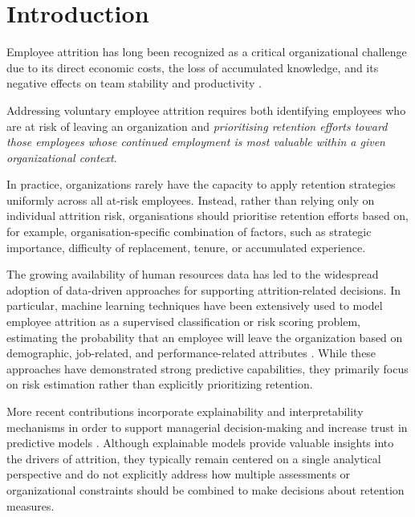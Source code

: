 \documentclass[runningheads]{llncs}
\begin{document}
%
%
%
\newpage
\section{Introduction}

Employee attrition has long been recognized as a critical organizational challenge due to its direct economic costs, the loss of accumulated knowledge, and its negative effects on team stability and productivity \cite{ref_manafi2025,ref_gundlach2025}.

Addressing voluntary employee attrition requires both identifying employees who are at risk of leaving an organization and \textit{prioritising retention efforts toward those employees whose continued employment is most valuable within a given organizational context}.

In practice, organizations rarely have the capacity to apply retention strategies uniformly across all at-risk employees. Instead, rather than relying only on individual attrition risk, organisations should prioritise retention efforts based on, for example, organisation-specific combination of factors, such as strategic importance, difficulty of replacement, tenure, or accumulated experience.

The growing availability of human resources data has led to the widespread adoption of data-driven approaches for supporting attrition-related decisions.
In particular, machine learning techniques have been extensively used to model employee attrition as a supervised classification or risk scoring problem, estimating the probability that an employee will leave the organization based on demographic, job-related, and performance-related attributes \cite{ref_kambhampati2024,ref_biswas2023,ref_park2024,ref_habous2021,ref_jin2024}.
While these approaches have demonstrated strong predictive capabilities, they primarily focus on risk estimation rather than explicitly prioritizing retention.

More recent contributions incorporate explainability and interpretability mechanisms in order to support managerial decision-making and increase trust in predictive models \cite{ref_baydili2025,ref_konar2025}.
Although explainable models provide valuable insights into the drivers of attrition, they typically remain centered on a single analytical perspective and do not explicitly address how multiple assessments or organizational constraints should be combined to make decisions about retention measures.
\end{document}
